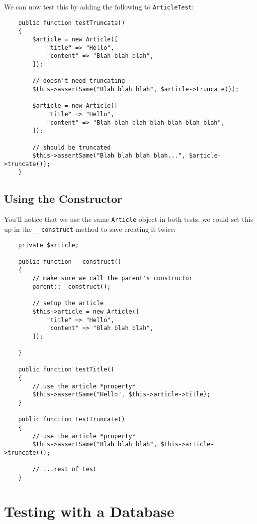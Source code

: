 We can now test this by adding the following to \texttt{ArticleTest}:

\begin{verbatim}
    public function testTruncate()
    {
        $article = new Article([
            "title" => "Hello",
            "content" => "Blah blah blah",
        ]);

        // doesn't need truncating
        $this->assertSame("Blah blah blah", $article->truncate());

        $article = new Article([
            "title" => "Hello",
            "content" => "Blah blah blah blah blah blah blah",
        ]);

        // should be truncated
        $this->assertSame("Blah blah blah blah...", $article->truncate());
    }
\end{verbatim}


\subsection{Using the Constructor}

You'll notice that we use the same \texttt{Article} object in both tests, we could set this up in the \texttt{\_\_construct} method to save creating it twice:

\begin{verbatim}
    private $article;

    public function __construct()
    {
        // make sure we call the parent's constructor
        parent::__construct();

        // setup the article
        $this->article = new Article([
            "title" => "Hello",
            "content" => "Blah blah blah",
        ]);

    }

    public function testTitle()
    {
        // use the article *property*
        $this->assertSame("Hello", $this->article->title);
    }

    public function testTruncate()
    {
        // use the article *property*
        $this->assertSame("Blah blah blah", $this->article->truncate());

        // ...rest of test
    }
\end{verbatim}


\section{Testing with a Database}

